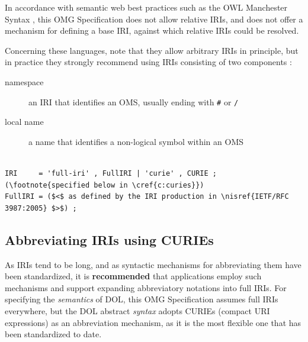 \documentclass[10pt,fleqn,%
\ifpretendfinal
final%
\else
draft%
\fi,
]{scrreprt}
\makeatletter
\newcommand*\CommentAuthor{}
\renewcommand*\CommentAuthor{#1}}
\newcommand*\CommentDate{}
\renewcommand*\CommentDate{#1}}
\newcommand*\CommentId{}
\renewcommand*\CommentId{#1}}
\newcommand*\CommentType{}
\renewcommand*\CommentType{#1}}
\newcommand*{\SetCommentColorByType}[1]{%
\edef\localType{{#1}}%
\expandafter\ifstrequal\localType{q-aut}{\colorlet{CommentColor}{red}}{%
\expandafter\ifstrequal\localType{q-all}{\colorlet{CommentColor}{orange}}{%
\expandafter\ifstrequal\localType{todo}{\colorlet{CommentColor}{orange}}{%
\expandafter\ifstrequal\localType{fyi}{\colorlet{CommentColor}{lightgray}}{%
\colorlet{CommentColor}{yellow}}}}}}
\newcommand*{\SetCommentPrefixByType}[1]{%
\edef\localType{{#1}}%
\expandafter\@ifmtarg\localType{%
\edef\CommentPrefix{}%
}{%
\caseupper[q]{#1}%
\edef\CommentPrefix{\thestring: }%
}}
\newcommand*{\initComment}[1]{%
\setkeys{Comment}{#1}%
\SetCommentColorByType{\CommentType}%
\relax%
\SetCommentPrefixByType{\CommentType}%
\relax%
}
\newcommand*{\todonote}[2][]{%
\initComment{#1}%
\pdfcomment[author=\CommentAuthor,color=CommentColor,date=\CommentDate,id=\CommentId]{%
\CommentPrefix
#2}}
\renewcommand*{\todonote}[2][]{%
\initComment{#1}%
\ednote{\CommentPrefix #2}}
\newcommand*{\syntax}[1]{\texttt{#1}}
\newcommand*{\recommended}{\textbf{recommended}\xspace}
\newcommand*{\IS}{OMG Specification\xspace}
\newcommand{\clauserefname}{clause}
\newcommand{\cref}[1]{\clauserefname~\ref{#1}}
\newcommand{\ssclause}[1]{\subsection{#1}}
\newcommand{\nisref}[1]{#1}
\makeatother
\begin{document}

In accordance with semantic web best practices such as the OWL Manchester Syntax 
\cite{W3C:NOTE-owl2-manchester-syntax-20091027}, this \IS does not allow relative IRIs, and does 
not offer a mechanism for defining a base IRI, against which relative IRIs could be resolved.

Concerning these languages, note that they allow arbitrary IRIs in principle, but in practice they 
strongly recommend using IRIs consisting of two components \cite{W3C:NOTE-swbp-vocab-pub-20080828}:
\begin{description}
\item[namespace] an IRI that identifies an OMS,
usually ending with \syntax{\#} or \syntax{/}
\item[local name] a name that identifies a non-logical symbol within an OMS
\end{description}

\begin{lstlisting}[language=ebnf,escapeinside={()}]  % abstract syntax

IRI     = 'full-iri' , FullIRI | 'curie' , CURIE ; (\footnote{specified below in \cref{c:curies}}) 
FullIRI = ($<$ as defined by the IRI production in \nisref{IETF/RFC 3987:2005} $>$) ;
\end{lstlisting}

\ssclause{Abbreviating IRIs using CURIEs}\label{c:curies}

As IRIs tend to be long, and as syntactic mechanisms for abbreviating them have been standardized, 
it is \recommended that applications employ such mechanisms and support expanding abbreviatory
notations into full IRIs.  For specifying the \emph{semantics} of DOL, this \IS assumes full IRIs 
everywhere, but the DOL abstract \emph{syntax} adopts CURIEs (compact URI expressions) as an 
abbreviation mechanism, as it is the most flexible one that has been standardized to date.  
\end{document}
